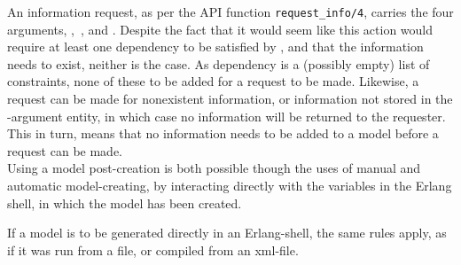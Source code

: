 \newpage
\noindent

An information request, as per the API function \lstinline{request_info/4}, carries the four arguments, , ,  and . Despite the fact that it would seem like this action would require at least one dependency to be satisfied by , and that the information needs to exist, neither is the case. As dependency is a (possibly empty) list of constraints, none of these  to be added for a request to be made. Likewise, a request can be made for nonexistent information, or information not stored in the -argument entity, in which case no information will be returned to the requester. This in turn, means that no information needs to be added to a model before a request can be made.\\[0.1cm]
Using a model post-creation is both possible though the uses of manual and automatic model-creating, by interacting directly with the variables in the Erlang shell, in which the model has been created. 

If a model is to be generated directly in an Erlang-shell, the same rules apply, as if it was run from a file, or compiled from an xml-file.
